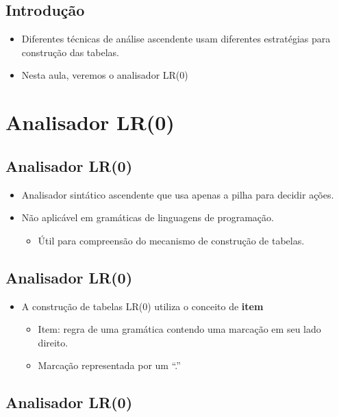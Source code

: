 \documentclass[11pt]{article}
\begin{document}
\subsection*{Introdução}
\label{sec:org1f138e5}

\begin{itemize}
\item Diferentes técnicas de análise ascendente usam diferentes
estratégias para construção das tabelas.

\item Nesta aula, veremos o analisador LR(0)
\end{itemize}
\section*{Analisador LR(0)}
\label{sec:orgd6e76bf}

\subsection*{Analisador LR(0)}
\label{sec:orgb3df8fa}

\begin{itemize}
\item Analisador sintático ascendente que usa apenas a pilha para decidir ações.

\item Não aplicável em gramáticas de linguagens de programação.
\begin{itemize}
\item Útil para compreensão do mecanismo de construção de tabelas.
\end{itemize}
\end{itemize}
\subsection*{Analisador LR(0)}
\label{sec:orgd6f6b3e}

\begin{itemize}
\item A construção de tabelas LR(0) utiliza o conceito de \textbf{item}
\begin{itemize}
\item Item: regra de uma gramática contendo uma marcação em seu lado direito.
\item Marcação representada por um ``.''
\end{itemize}
\end{itemize}
\subsection*{Analisador LR(0)}
\label{sec:orga998d9e}
\end{document}
